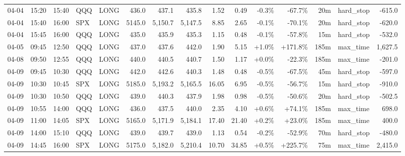 \documentclass[11pt,a4paper,twoside]{article}
\begin{document}
\begin{landscape}
\begin{center}
\begin{longtable}{>{\color{txtmain}}l l l l l r r r r r r r r >{\color{txtmain}}l r}
04-04 & 15:20 & 15:40 & QQQ & LONG & 436.0 & 437.1 & 435.8 & 1.52 & 0.49 & \textcolor{lossred}{-0.3\%} & \textcolor{lossred}{-67.7\%} & 20m & hard\_stop & \textcolor{lossred}{-615.0} \\
04-04 & 15:40 & 16:00 & SPX & LONG & 5145.0 & 5,150.7 & 5,147.5 & 8.85 & 2.65 & \textcolor{lossred}{-0.1\%} & \textcolor{lossred}{-70.1\%} & 20m & hard\_stop & \textcolor{lossred}{-620.0} \\
04-04 & 15:45 & 16:00 & QQQ & LONG & 435.0 & 435.9 & 435.3 & 1.15 & 0.48 & \textcolor{lossred}{-0.1\%} & \textcolor{lossred}{-57.8\%} & 15m & hard\_stop & \textcolor{lossred}{-532.0} \\
04-05 & 09:45 & 12:50 & QQQ & LONG & 437.0 & 437.6 & 442.0 & 1.90 & 5.15 & \textcolor{wingreen}{+1.0\%} & \textcolor{wingreen}{+171.8\%} & 185m & max\_time & \textcolor{wingreen}{1,627.5} \\
04-08 & 09:50 & 12:55 & QQQ & LONG & 440.0 & 440.5 & 440.7 & 1.50 & 1.17 & \textcolor{wingreen}{+0.0\%} & \textcolor{lossred}{-22.3\%} & 185m & max\_time & \textcolor{lossred}{-201.0} \\
04-09 & 09:45 & 10:30 & QQQ & LONG & 442.0 & 442.6 & 440.3 & 1.48 & 0.48 & \textcolor{lossred}{-0.5\%} & \textcolor{lossred}{-67.5\%} & 45m & hard\_stop & \textcolor{lossred}{-597.0} \\
04-09 & 10:30 & 10:45 & SPX & LONG & 5185.0 & 5,193.2 & 5,165.5 & 16.05 & 6.95 & \textcolor{lossred}{-0.5\%} & \textcolor{lossred}{-56.7\%} & 15m & hard\_stop & \textcolor{lossred}{-910.0} \\
04-09 & 10:30 & 10:50 & QQQ & LONG & 439.0 & 440.3 & 437.9 & 1.98 & 0.98 & \textcolor{lossred}{-0.5\%} & \textcolor{lossred}{-50.6\%} & 20m & hard\_stop & \textcolor{lossred}{-502.5} \\
04-09 & 10:55 & 14:00 & QQQ & LONG & 436.0 & 437.5 & 440.0 & 2.35 & 4.10 & \textcolor{wingreen}{+0.6\%} & \textcolor{wingreen}{+74.1\%} & 185m & max\_time & \textcolor{wingreen}{698.0} \\
04-09 & 11:00 & 14:05 & SPX & LONG & 5165.0 & 5,171.9 & 5,184.1 & 17.40 & 21.40 & \textcolor{wingreen}{+0.2\%} & \textcolor{wingreen}{+23.0\%} & 185m & max\_time & \textcolor{wingreen}{400.0} \\
04-09 & 14:00 & 15:10 & QQQ & LONG & 439.0 & 439.7 & 439.0 & 1.13 & 0.54 & \textcolor{lossred}{-0.2\%} & \textcolor{lossred}{-52.9\%} & 70m & hard\_stop & \textcolor{lossred}{-480.0} \\
04-09 & 14:45 & 16:00 & SPX & LONG & 5175.0 & 5,182.0 & 5,210.4 & 10.70 & 34.85 & \textcolor{wingreen}{+0.5\%} & \textcolor{wingreen}{+225.7\%} & 75m & max\_time & \textcolor{wingreen}{2,415.0} \\

\end{longtable}
\end{center}
\end{landscape}
\end{document}
